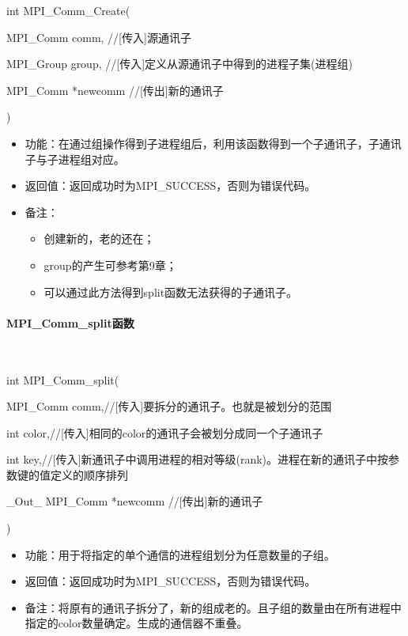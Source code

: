\documentclass[UTF8]{article}%
\begin{document}
int MPI\_Comm\_Create(
    
    \qquad MPI\_Comm comm, //[传入]源通讯子

    \qquad MPI\_Group group, //[传入]定义从源通讯子中得到的进程子集(进程组)

    \qquad MPI\_Comm *newcomm //[传出]新的通讯子
    
    )

\begin{itemize}
    \item 功能：在通过组操作得到子进程组后，利用该函数得到一个子通讯子，子通讯子与子进程组对应。
    \item 返回值：返回成功时为MPI\_SUCCESS，否则为错误代码。
    \item 备注：
    
    {
        \begin{itemize}
            \item 创建新的，老的还在；
            \item group的产生可参考第9章；
            \item 可以通过此方法得到split函数无法获得的子通讯子。
        \end{itemize}
    }
\end{itemize}

\paragraph{MPI\_Comm\_split函数}~{}

int MPI\_Comm\_split(

    \qquad MPI\_Comm comm,//[传入]要拆分的通讯子。也就是被划分的范围

    \qquad int color,//[传入]相同的color的通讯子会被划分成同一个子通讯子

    \qquad int key,//[传入]新通讯子中调用进程的相对等级(rank)。进程在新的通讯子中按参数键的值定义的顺序排列
    
    \qquad \_Out\_ MPI\_Comm *newcomm //[传出]新的通讯子

    )

\begin{itemize}
    \item 功能：用于将指定的单个通信的进程组划分为任意数量的子组。
    \item 返回值：返回成功时为MPI\_SUCCESS，否则为错误代码。
    \item 备注：将原有的通讯子拆分了，新的组成老的。且子组的数量由在所有进程中指定的color数量确定。生成的通信器不重叠。
\end{itemize}
\end{document}

